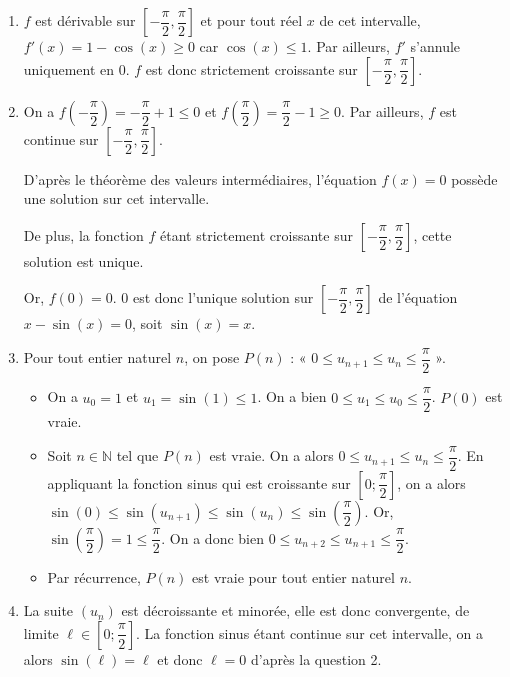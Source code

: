 \documentclass[11pt,fleqn, openany]{book} %
\begin{document}
\begin{solution}\hspace{0pt}
\begin{enumerate}
\item $f$ est dérivable sur $\left[-\dfrac{\pi}{2},\dfrac{\pi}{2}\right]$ et pour tout réel $x$ de cet intervalle, $f'(x)=1-\cos(x) \geqslant 0$ car $\cos(x) \leqslant 1$. Par ailleurs, $f'$ s'annule uniquement en $0$. $f$ est donc strictement croissante sur $\left[-\dfrac{\pi}{2},\dfrac{\pi}{2}\right]$.
\vskip5pt
\item On a $f\left(-\dfrac{\pi}{2}\right)=-\dfrac{\pi}{2}+1 \leqslant 0$ et $f\left(\dfrac{\pi}{2}\right)=\dfrac{\pi}{2}-1 \geqslant 0$. Par ailleurs, $f$ est continue sur  $\left[-\dfrac{\pi}{2},\dfrac{\pi}{2}\right]$. 

D'après le théorème des valeurs intermédiaires, l'équation $f(x)=0$ possède une solution sur cet intervalle. 

De plus, la fonction $f$ étant strictement croissante sur  $\left[-\dfrac{\pi}{2},\dfrac{\pi}{2}\right]$, cette solution est unique. 

Or, $f(0)=0$. $0$ est donc l'unique solution sur  $\left[-\dfrac{\pi}{2},\dfrac{\pi}{2}\right]$ de l'équation $x-\sin(x)=0$, soit $\sin(x)=x$. 
\vskip5pt
\item Pour tout entier naturel $n$, on pose $P(n)$ : « $0 \leqslant u_{n+1} \leqslant u_n \leqslant \dfrac{\pi}{2}$ ».
\begin{itemize}
\item On a $u_0=1$ et $u_1=\sin(1)\leqslant 1$. On a bien $0 \leqslant u_{1} \leqslant u_0 \leqslant \dfrac{\pi}{2}$. $P(0)$ est vraie.
\item Soit $n\in\mathbb{N}$ tel que $P(n)$ est vraie. On a alors $0 \leqslant u_{n+1} \leqslant u_n \leqslant \dfrac{\pi}{2}$. En appliquant la fonction sinus qui est croissante sur $\left[0;\dfrac{\pi}{2}\right]$, on a alors $\sin(0) \leqslant \sin(u_{n+1}) \leqslant \sin(u_n) \leqslant \sin\left(\dfrac{\pi}{2}\right)$. Or, $\sin\left(\dfrac{\pi}{2}\right)=1 \leqslant \dfrac{\pi}{2}$. On a donc bien $0 \leqslant u_{n+2} \leqslant u_{n+1} \leqslant \dfrac{\pi}{2}$.
\item Par récurrence, $P(n)$ est vraie pour tout entier naturel $n$.
\end{itemize}
\vskip5pt
\item La suite $(u_n)$ est décroissante et minorée, elle est donc convergente, de limite $\ell \in \left[0;\dfrac{\pi}{2}\right]$. La fonction sinus étant continue sur cet intervalle, on a alors $\sin(\ell)=\ell$ et donc $\ell=0$ d'après la question 2.
\end{enumerate}\end{solution}
\end{document}
